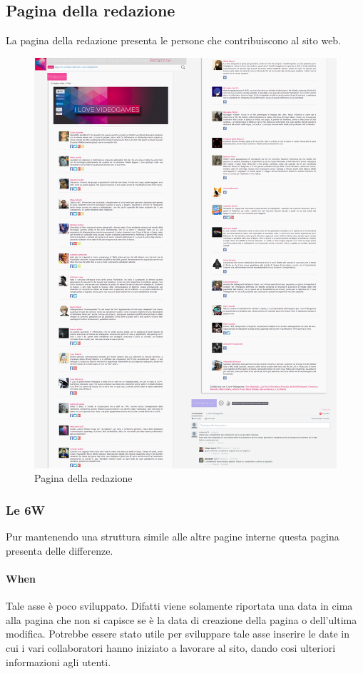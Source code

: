 \documentclass[../ProgettoTecWeb2.tex]{subfiles}
\begin{document}
	\subsection{Pagina della redazione}
	La pagina della redazione presenta le persone che contribuiscono al sito web.
	\begin{figure} [H]
			\centering
			\includegraphics[scale=0.15]{img/Redazione}
			\caption{Pagina della redazione}
	\end{figure}
		\subsubsection{Le 6W}
		Pur mantenendo una struttura simile alle altre pagine interne questa pagina presenta delle differenze.

			\paragraph{When}
			Tale asse è poco sviluppato. Difatti viene solamente riportata una data in cima alla pagina che non si capisce se è la data di creazione della pagina o dell'ultima modifica. Potrebbe essere stato utile per sviluppare tale asse inserire le date in cui i vari collaboratori hanno iniziato a lavorare al sito, dando cosi ulteriori informazioni agli utenti.
\end{document}
